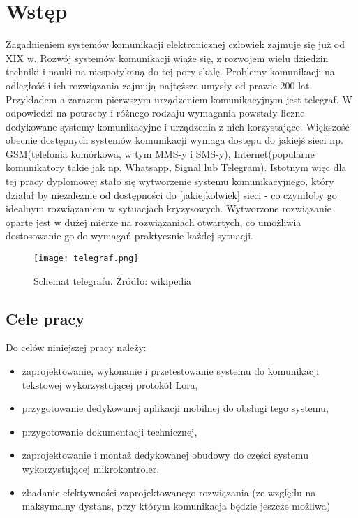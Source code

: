 \newpage %
\section{Wstęp}
Zagadnieniem systemów komunikacji elektronicznej człowiek zajmuje się już od XIX w. Rozwój systemów komunikacji wiąże się, z rozwojem wielu dziedzin techniki i nauki na niespotykaną do tej pory skalę. Problemy komunikacji na odległość i ich rozwiązania zajmują najtęższe umysły od prawie 200 lat. Przykładem a zarazem pierwszym urządzeniem komunikacyjnym jest telegraf\cite{wiki:telegraf2023}.
W odpowiedzi na potrzeby i różnego rodzaju wymagania powstały liczne dedykowane systemy komunikacyjne i urządzenia z nich korzystające.
Większość obecnie dostępnych systemów komunikacji wymaga dostępu do jakiejś sieci np. GSM(telefonia komórkowa, w tym MMS-y i SMS-y), Internet(popularne komunikatory takie jak np. Whatsapp, Signal lub Telegram).
Istotnym więc dla tej pracy dyplomowej stało się wytworzenie systemu komunikacyjnego, który działał by niezależnie od dostępności do [jakiejkolwiek] sieci - co czyniłoby go idealnym rozwiązaniem w sytuacjach kryzysowych.
Wytworzone rozwiązanie oparte jest w dużej mierze na rozwiązaniach otwartych, co umożliwia dostosowanie go do wymagań praktycznie każdej sytuacji.
\begin{figure}[!h]
	\centering \texttt{[image: telegraf.png]}
	\caption{Schemat telegrafu. Źródło: wikipedia}
	\label{fig:telegraf}
\end{figure}
\subsection{Cele pracy}
Do celów niniejszej pracy należy:
\begin{itemize}
	\item zaprojektowanie, wykonanie i przetestowanie systemu do komunikacji tekstowej wykorzystującej protokół Lora,
	\item przygotowanie dedykowanej aplikacji mobilnej do obsługi tego systemu,
	\item przygotowanie dokumentacji technicznej,
	\item zaprojektowanie i montaż dedykowanej obudowy do części systemu wykorzystującej mikrokontroler,
	\item zbadanie efektywności zaprojektowanego rozwiązania (ze względu na maksymalny dystans, przy którym komunikacja będzie jeszcze możliwa)
\end{itemize}